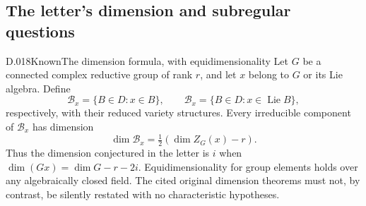 \subsection{The letter's dimension and subregular questions}
\begin{saresult}{D.018}{Known}{The dimension formula, with equidimensionality}
Let $G$ be a connected complex reductive group of rank $r$, and let
$x$ belong to $G$ or its Lie algebra.  Define
\[
 \mathcal B_x=\{B\in D:x\in B\},\qquad
 \mathcal B_x=\{B\in D:x\in\operatorname{Lie}B\},
\]
respectively, with their reduced variety structures.  Every
irreducible component of $\mathcal B_x$ has dimension
\[
 \dim\mathcal B_x=\tfrac12(\dim Z_G(x)-r).
                                                        \tag{D.18.1}
\]
Thus the dimension conjectured in the letter is $i$ when
$\dim(Gx)=\dim G-r-2i$.  Equidimensionality for group elements
holds over any algebraically closed field.  The cited original
dimension theorems must not, by contrast, be silently restated
with no characteristic hypotheses.
\end{saresult}
